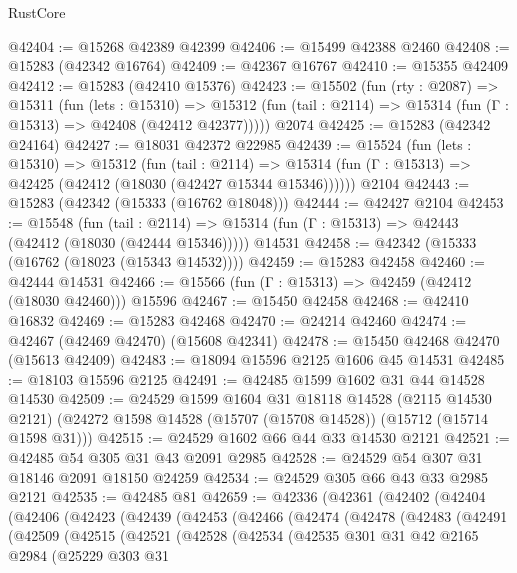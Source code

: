 \begin{lexlean}{RustCore}
\begin{coremodule}
@42404 := @15268 @42389 @42399
@42406 := @15499 @42388 @2460
@42408 := @15283 (@42342 @16764)
@42409 := @42367 @16767
@42410 := @15355 @42409
@42412 := @15283 (@42410 @15376)
@42423 := @15502
    (fun (rty : @2087) =>
    @15311
      (fun (lets : @15310) =>
      @15312 (fun (tail : @2114) => @15314 (fun (Γ : @15313) => @42408 (@42412 @42377)))))
    @2074
@42425 := @15283 (@42342 @24164)
@42427 := @18031 @42372 @22985
@42439 := @15524
    (fun (lets : @15310) =>
    @15312
      (fun (tail : @2114) =>
      @15314 (fun (Γ : @15313) => @42425 (@42412 (@18030 (@42427 @15344 @15346))))))
    @2104
@42443 := @15283 (@42342 (@15333 (@16762 @18048)))
@42444 := @42427 @2104
@42453 := @15548
    (fun (tail : @2114) => @15314 (fun (Γ : @15313) => @42443 (@42412 (@18030 (@42444 @15346)))))
    @14531
@42458 := @42342 (@15333 (@16762 (@18023 (@15343 @14532))))
@42459 := @15283 @42458
@42460 := @42444 @14531
@42466 := @15566 (fun (Γ : @15313) => @42459 (@42412 (@18030 @42460))) @15596
@42467 := @15450 @42458
@42468 := @42410 @16832
@42469 := @15283 @42468
@42470 := @24214 @42460
@42474 := @42467 (@42469 @42470) (@15608 @42341)
@42478 := @15450 @42468 @42470 (@15613 @42409)
@42483 := @18094 @15596 @2125 @1606 @45 @14531
@42485 := @18103 @15596 @2125
@42491 := @42485 @1599 @1602 @31 @44 @14528 @14530
@42509 := @24529
    @1599
    @1604
    @31
    @18118
    @14528
    (@2115 @14530 @2121)
    (@24272 @1598 @14528 (@15707 (@15708 @14528)) (@15712 (@15714 @1598 @31)))
@42515 := @24529 @1602 @66 @44 @33 @14530 @2121
@42521 := @42485 @54 @305 @31 @43 @2091 @2985
@42528 := @24529 @54 @307 @31 @18146 @2091 @18150 @24259
@42534 := @24529 @305 @66 @43 @33 @2985 @2121
@42535 := @42485 @81
@42659 := @42336
    (@42361
      (@42402
        (@42404
          (@42406
            (@42423
              (@42439
                (@42453
                  (@42466
                    (@42474
                      (@42478
                        (@42483
                          (@42491
                            (@42509
                              (@42515
                                (@42521
                                  (@42528
                                    (@42534
                                      (@42535
                                        @301
                                        @31
                                        @42
                                        @2165
                                        @2984
                                        (@25229
                                          @303
                                          @31

\end{coremodule}
\end{lexlean}
